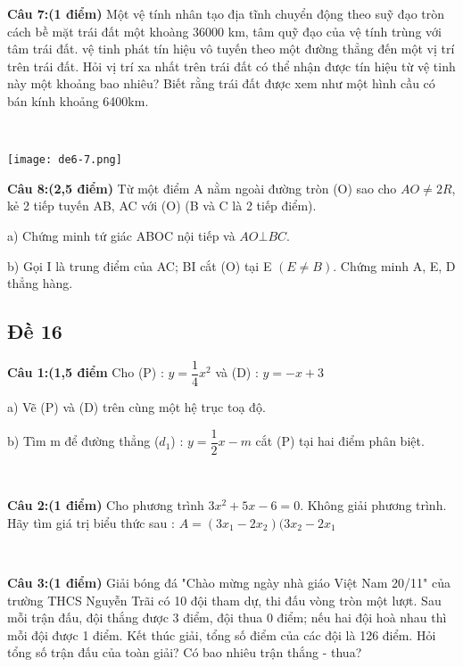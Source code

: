 \documentclass[12pt]{article}
\begin{document}
\begin{multicols}{2}

\textbf{Câu 7:(1 điểm)} Một vệ tính nhân tạo địa tĩnh chuyển động theo suỹ đạo tròn cách bề mặt trái đất một khoàng 36000 km, tâm quỹ đạo của vệ tính trùng với tâm trái đất. vệ tinh phát tín hiệu vô tuyến theo một đường thẳng đến một vị trí trên trái đất. Hỏi vị trí xa nhất trên trái đất có thể nhận được tín hiệu từ vệ tinh này một khoảng bao nhiêu? Biết rằng trái đất được xem như một hình cầu có bán kính khoảng 6400km. 

\columnbreak

\   

\begin{center}
    \texttt{[image: de6-7.png]}
\end{center}

\end{multicols}

\textbf{Câu 8:(2,5 điểm)} Từ một điểm A nằm ngoài đường tròn (O) sao cho $AO \ne 2R$, kẻ 2 tiếp tuyến AB, AC với (O) (B và C là 2 tiếp điểm). \par
a) Chứng minh tứ giác ABOC nội tiếp và $AO \bot BC$. \par
b) Gọi I là trung điểm của AC; BI cắt (O) tại E $(E\ne B)$. Chứng minh A, E, D thẳng hàng.

\break

\subsection{Đề 16}

\textbf{Câu 1:(1,5 điểm} Cho (P) : $y = \dfrac{1}{4}x^2$ và (D) : $y = -x + 3$ \par
a) Vẽ (P) và (D) trên cùng một hệ trục toạ độ. \par
b) Tìm m để đường thẳng ($d_1$) : $y = \dfrac{1}{2}x - m$ cắt (P) tại hai điểm phân biệt. \par

\    

\textbf{Câu 2:(1 điểm)} Cho phương trình $3x^2 + 5x - 6 = 0$. Không giải phương trình. Hãy tìm giá trị biểu thức sau : $A = (3x_1 - 2x_2)(3x_2 - 2x_1$ \par

\    

\textbf{Câu 3:(1 điểm)} Giải bóng đá "Chào mừng ngày nhà giáo Việt Nam 20/11" của trường THCS Nguyễn Trãi có 10 đội tham dự, thi đấu vòng tròn một lượt. Sau mỗi trận đấu, đội thắng được 3 điểm, đội thua 0 điểm; nếu hai đội hoà nhau thì mỗi đội được 1 điểm. Kết thúc giải, tổng số điểm của các đội là 126 điểm. Hỏi tổng số trận đấu của toàn giải? Có bao nhiêu trận thắng - thua? \par
\end{document}
